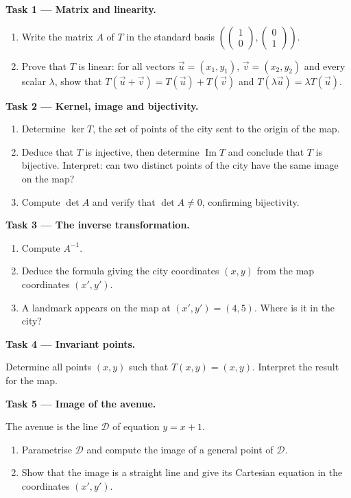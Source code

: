 \documentclass[11pt]{article}
\newcounter{popsec}
\newcounter{popsub}
\newcommand{\courssub}[1]{%
  \stepcounter{popsub}%
  \par\vspace{9pt}\noindent{\popxbold\fontsize{11.5}{13}\selectfont\color{popink}{\color{poporange}\thepopsec.\thepopsub}\hspace{6pt}#1}\par\nopagebreak\vspace{4pt}
}
\begin{document}
\courssub{Tasks}

\textbf{Task 1 — Matrix and linearity.}
\begin{enumerate}
\item Write the matrix $A$ of $T$ in the standard basis $\left(\begin{pmatrix}1\\0\end{pmatrix},\begin{pmatrix}0\\1\end{pmatrix}\right)$.
\item Prove that $T$ is linear: for all vectors $\vec{u}=(x_1,y_1)$, $\vec{v}=(x_2,y_2)$ and every scalar $\lambda$, show that $T(\vec{u}+\vec{v})=T(\vec{u})+T(\vec{v})$ and $T(\lambda\vec{u})=\lambda T(\vec{u})$.
\end{enumerate}

\textbf{Task 2 — Kernel, image and bijectivity.}
\begin{enumerate}
\item Determine $\ker T$, the set of points of the city sent to the origin of the map.
\item Deduce that $T$ is injective, then determine $\operatorname{Im} T$ and conclude that $T$ is bijective. Interpret: can two distinct points of the city have the same image on the map?
\item Compute $\det A$ and verify that $\det A \neq 0$, confirming bijectivity.
\end{enumerate}

\textbf{Task 3 — The inverse transformation.}
\begin{enumerate}
\item Compute $A^{-1}$.
\item Deduce the formula giving the city coordinates $(x,y)$ from the map coordinates $(x',y')$.
\item A landmark appears on the map at $(x',y')=(4,5)$. Where is it in the city?
\end{enumerate}

\textbf{Task 4 — Invariant points.}

Determine all points $(x,y)$ such that $T(x,y)=(x,y)$. Interpret the result for the map.

\textbf{Task 5 — Image of the avenue.}

The avenue is the line $\mathcal{D}$ of equation $y=x+1$.
\begin{enumerate}
\item Parametrise $\mathcal{D}$ and compute the image of a general point of $\mathcal{D}$.
\item Show that the image is a straight line and give its Cartesian equation in the coordinates $(x',y')$.
\end{enumerate}
\end{document}
